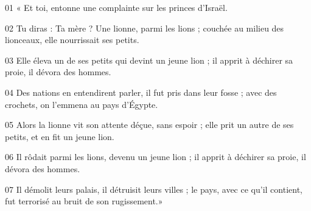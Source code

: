 01 « Et toi, entonne une complainte sur les princes d’Israël.

02 Tu diras : Ta mère ? Une lionne, parmi les lions ; couchée au milieu des lionceaux, elle nourrissait ses petits.

03 Elle éleva un de ses petits qui devint un jeune lion ; il apprit à déchirer sa proie, il dévora des hommes.

04 Des nations en entendirent parler, il fut pris dans leur fosse ; avec des crochets, on l’emmena au pays d’Égypte.

05 Alors la lionne vit son attente déçue, sans espoir ; elle prit un autre de ses petits, et en fit un jeune lion.

06 Il rôdait parmi les lions, devenu un jeune lion ; il apprit à déchirer sa proie, il dévora des hommes.

07 Il démolit leurs palais, il détruisit leurs villes ; le pays, avec ce qu’il contient, fut terrorisé au bruit de son rugissement.»